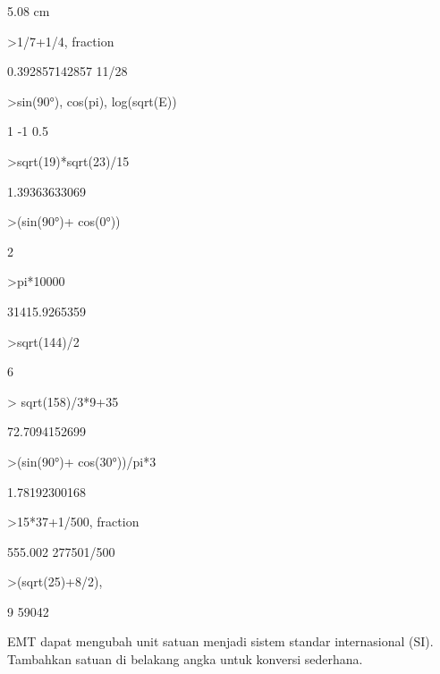 \documentclass{article}
\begin{document}
\begin{eulernotebook}
\begin{eulercomment}
\begin{eulercomment}
\begin{euleroutput}
  5.08 cm
\end{euleroutput}
\begin{eulerprompt}
>1/7+1/4, fraction %
\end{eulerprompt}
\begin{euleroutput}
  0.392857142857
  11/28
\end{euleroutput}
\begin{eulerprompt}
>sin(90°), cos(pi), log(sqrt(E))
\end{eulerprompt}
\begin{euleroutput}
  1
  -1
  0.5
\end{euleroutput}
\begin{eulerprompt}
>sqrt(19)*sqrt(23)/15
\end{eulerprompt}
\begin{euleroutput}
  1.39363633069
\end{euleroutput}
\begin{eulerprompt}
>(sin(90°)+ cos(0°))
\end{eulerprompt}
\begin{euleroutput}
  2
\end{euleroutput}
\begin{eulerprompt}
>pi*10000
\end{eulerprompt}
\begin{euleroutput}
  31415.9265359
\end{euleroutput}
\begin{eulerprompt}
>sqrt(144)/2
\end{eulerprompt}
\begin{euleroutput}
  6
\end{euleroutput}
\begin{eulerprompt}
> sqrt(158)/3*9+35
\end{eulerprompt}
\begin{euleroutput}
  72.7094152699
\end{euleroutput}
\begin{eulerprompt}
>(sin(90°)+ cos(30°))/pi*3
\end{eulerprompt}
\begin{euleroutput}
  1.78192300168
\end{euleroutput}
\begin{eulerprompt}
>15*37+1/500, fraction %
\end{eulerprompt}
\begin{euleroutput}
  555.002
  277501/500
\end{euleroutput}
\begin{eulerprompt}
>(sqrt(25)+8/2), %
\end{eulerprompt}
\begin{euleroutput}
  9
  59042
\end{euleroutput}
\eulersubheading{}
\begin{eulercomment}
EMT dapat mengubah unit satuan menjadi sistem standar internasional
(SI). Tambahkan satuan di belakang angka untuk konversi sederhana.


\end{eulercomment}
\end{eulercomment}
\end{eulercomment}
\end{eulernotebook}
\end{document}
